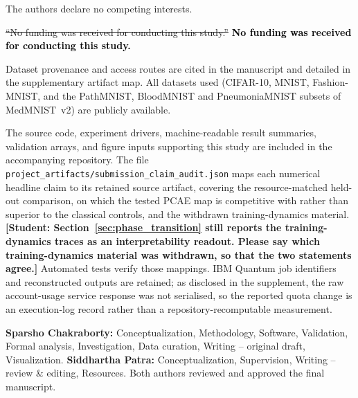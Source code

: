 \documentclass[pdflatex,sn-basic]{sn-jnl}
\newcommand{\del}[1]{\sout{#1}}
\newcommand{\add}[1]{\textbf{\textcolor{black}{#1}}}
\begin{document}
\begin{description}\itemsep4pt
  \item[Competing interests.] The authors declare no competing interests.

  \item[Funding.] \del{``No funding was received for conducting this study.''} \add{No funding was received for conducting this study.}

  \item[Data availability.] Dataset provenance and access routes are cited in the
        manuscript and detailed in the supplementary artifact map. All datasets
        used (CIFAR-10, MNIST, Fashion-MNIST, and the PathMNIST, BloodMNIST and
        PneumoniaMNIST subsets of MedMNIST~v2) are publicly available.

  \item[Code availability.] The source code, experiment drivers,
        machine-readable result summaries, validation arrays, and figure inputs
        supporting this study are included in the accompanying repository. The
        file \texttt{project\_artifacts/submission\_claim\_audit.json} maps each
        numerical headline claim to its retained source artifact, covering the
        resource-matched held-out comparison, on which the tested PCAE map is
        competitive with rather than superior to the classical controls, and the
        withdrawn training-dynamics material. {\color{red}\textbf{[Student:
Section~\ref{sec:phase_transition} still reports the training-dynamics traces as
an interpretability readout. Please say which training-dynamics material was
withdrawn, so that the two statements agree.]}} Automated tests verify those
        mappings.
        IBM Quantum job identifiers and reconstructed outputs are retained; as
        disclosed in the supplement, the raw account-usage service response was
        not serialised, so the reported quota change is an execution-log record
        rather than a repository-recomputable measurement.

  \item[Author contributions.] \textbf{Sparsho Chakraborty:}
        Conceptualization, Methodology, Software, Validation, Formal analysis,
        Investigation, Data curation, Writing -- original draft, Visualization.
        \textbf{Siddhartha Patra:} Conceptualization, Supervision, Writing --
        review \& editing, Resources. Both authors reviewed and approved the
        final manuscript.
\end{description}

% 

\end{document}
